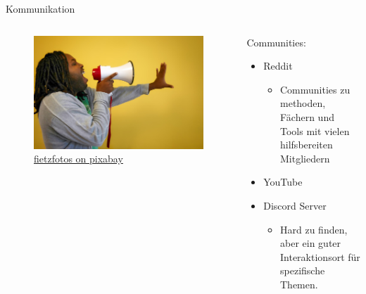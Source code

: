 \documentclass[aspectratio=169,shownotes]{beamer}
\begin{document}
\begin{frame}{Kommunikation}
    \begin{columns}[t]
        \begin{column}{0.4\textwidth}
            \vspace{-2em} 
            \begin{figure}
                \begin{flushleft}
                    \includegraphics[height=0.8\textheight,trim={4cm 0 17cm 0},clip]{graphics/call-2946023_1280.jpg}
                    \caption*{\href{https://pixabay.com/photos/call-afro-megaphone-scream-symbol-2946023/}{fietzfotos on pixabay}}    
                \end{flushleft}                
            \end{figure}            
        \end{column}
        \begin{column}{0.6\textwidth}
            Communities:
            \begin{itemize}
                \item Reddit 
                \begin{itemize}
                    \item Communities zu methoden, Fächern und Tools mit vielen hilfsbereiten Mitgliedern
                \end{itemize} 
                \item YouTube 
                \item Discord Server
                \begin{itemize}
                    \item Hard zu finden, aber ein guter Interaktionsort für spezifische Themen.
                \end{itemize}        
            \end{itemize}
        \end{column}
    \end{columns}
\end{frame}
\end{document}
